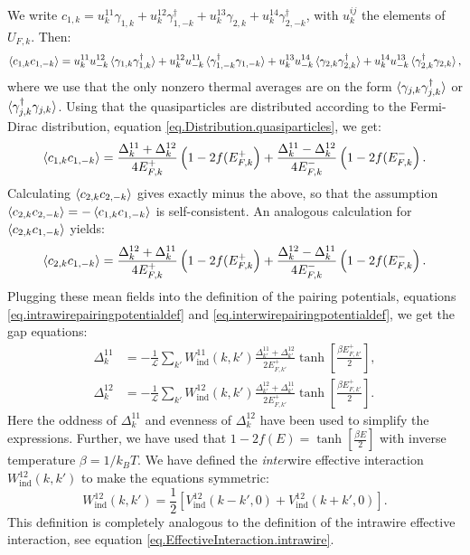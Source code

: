We write $c_{1,k} = u^{11}_{k} \gamma_{1,k} + u^{12}_{k} \gamma^\dagger_{1,-k} + u^{13}_{k} \gamma_{2,k} + u^{14}_{k} \gamma^\dagger_{2,-k}$, with $u^{ij}_k$ the elements of $U_{F,k}$. Then:
\begin{equation}
\braket{c_{1,k}c_{1,-k}} = u^{11}_{k}u^{12}_{-k}\braket{\gamma_{1,k}\gamma^\dagger_{1,k}} + u^{12}_{k}u^{11}_{-k}\braket{\gamma^\dagger_{1,-k}\gamma_{1,-k}} + u^{13}_{k}u^{14}_{-k}\braket{\gamma_{2,k}\gamma^\dagger_{2,k}} + u^{14}_{k}u^{13}_{-k}\braket{\gamma^\dagger_{2,k}\gamma_{2,k}}, \nonumber
\end{equation}
where we use that the only nonzero thermal averages are on the form $\braket{\gamma_{j,k}\gamma^\dagger_{j,k}}$ or $\braket{\gamma^\dagger_{j,k}\gamma_{j,k}}$. Using that the quasiparticles are distributed according to the Fermi-Dirac distribution, equation \eqref{eq.Distribution.quasiparticles}, we get:
\begin{equation}
\braket{c_{1,k}c_{1,-k}} = \frac{\Delta^{11}_k + \Delta^{12}_k}{4E^{+}_{F,k}}\left(1 - 2f(E^{+}_{F,k}\right) + \frac{\Delta^{11}_k - \Delta^{12}_k}{4E^{-}_{F,k}}\left(1 - 2f(E^{-}_{F,k}\right). 
\label{eq.meanfield11}
\end{equation}
Calculating $\braket{c_{2,k}c_{2,-k}}$ gives exactly minus the above, so that the assumption $\braket{c_{2,k}c_{2,-k}} = -\braket{c_{1,k}c_{1,-k}}$ is self-consistent. An analogous calculation for $\braket{c_{2,k}c_{1,-k}}$ yields:
\begin{equation}
\braket{c_{2,k}c_{1,-k}} = \frac{\Delta^{12}_k + \Delta^{11}_k}{4E^{+}_{F,k}}\left(1 - 2f(E^{+}_{F,k}\right) + \frac{\Delta^{12}_k - \Delta^{11}_k}{4E^{-}_{F,k}}\left(1 - 2f(E^{-}_{F,k}\right). 
\label{eq.meanfield12}
\end{equation}
Plugging these mean fields into the definition of the pairing potentials, equations \eqref{eq.intrawirepairingpotentialdef} and \eqref{eq.interwirepairingpotentialdef}, we get the gap equations:
\begin{align}
\Delta^{11}_k &= -\frac{1}{\mathcal{L}}\sum_{k'} W_{\text{ind}}^{11}(k, k')\frac{\Delta^{11}_{k'} + \Delta^{12}_{k'}}{2E^{+}_{F,k'}}\tanh\left[\frac{\beta E^{+}_{F,k'}}{2}\right], \nonumber \\
\Delta^{12}_k &= -\frac{1}{\mathcal{L}}\sum_{k'} W_{\text{ind}}^{12}(k, k')\frac{\Delta^{12}_{k'} + \Delta^{11}_{k'}}{2E^{+}_{F,k'}}\tanh\left[\frac{\beta E^{+}_{F,k'}}{2}\right].
\label{eq.2wiresgapequations}
\end{align}
Here the oddness of $\Delta^{11}_k$ and evenness of $\Delta^{12}_k$ have been used to simplify the expressions. Further, we have used that $1 - 2f(E) = \tanh\left[\frac{\beta E}{2}\right]$ with inverse temperature $\beta = 1 / k_BT$. We have defined the \textit{inter}wire effective interaction $W_{\text{ind}}^{12}(k, k')$ to make the equations symmetric:
\begin{equation}
W_{\text{ind}}^{12}(k, k') = \frac{1}{2}\left[V_{\text{ind}}^{12}(k - k', 0) + V_{\text{ind}}^{12}(k + k', 0) \right].
\label{eq.EffectiveInteraction.interwire}
\end{equation}
This definition is completely analogous to the definition of the intrawire effective interaction, see equation \eqref{eq.EffectiveInteraction.intrawire}. 

